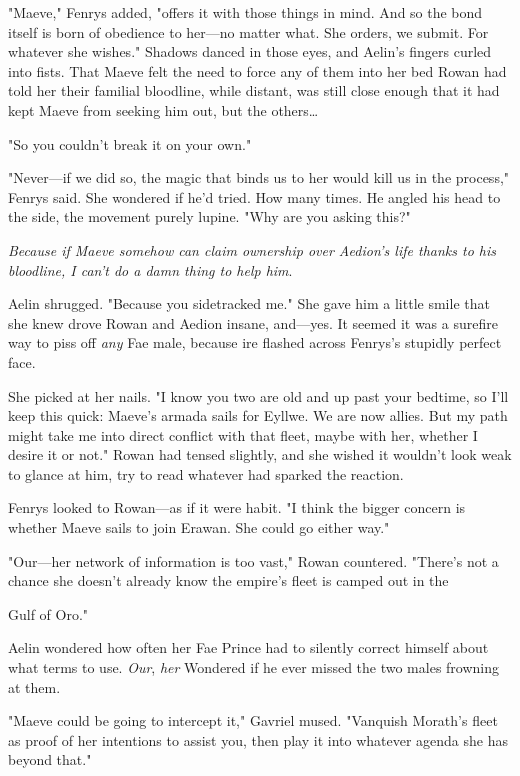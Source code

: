 "Maeve," Fenrys added, "offers it with those things in mind. And so the bond itself is born of obedience to her---no matter what. She orders, we submit. For whatever she wishes." Shadows danced in those eyes, and Aelin's fingers curled into fists. That Maeve felt the need to force any of them into her bed  Rowan had told her their familial bloodline, while distant, was still close enough that it had kept Maeve from seeking him out, but the others\ldots{}

"So you couldn't break it on your own."

"Never---if we did so, the magic that binds us to her would kill us in the process," Fenrys said. She wondered if he'd tried. How many times. He angled his head to the side, the movement purely lupine. "Why are you asking this?"

\emph{Because if Maeve somehow can claim ownership over Aedion's life thanks to his bloodline, I can't do a damn thing to help him}.

Aelin shrugged. "Because you sidetracked me." She gave him a little smile that she knew drove Rowan and Aedion insane, and---yes. It seemed it was a surefire way to piss off \emph{any} Fae male, because ire flashed across Fenrys's stupidly perfect face.

She picked at her nails. "I know you two are old and up past your bedtime, so I'll keep this quick: Maeve's armada sails for Eyllwe. We are now allies. But my path might take me into direct conflict with that fleet, maybe with her, whether I desire it or not." Rowan had tensed slightly, and she wished it wouldn't look weak to glance at him, try to read whatever had sparked the reaction.

Fenrys looked to Rowan---as if it were habit. "I think the bigger concern is whether Maeve sails to join Erawan. She could go either way."

"Our---her network of information is too vast," Rowan countered. "There's not a chance she doesn't already know the empire's fleet is camped out in the

Gulf of Oro."

Aelin wondered how often her Fae Prince had to silently correct himself about what terms to use. \emph{Our}, \emph{her}  Wondered if he ever missed the two males frowning at them.

"Maeve could be going to intercept it," Gavriel mused. "Vanquish Morath's fleet as proof of her intentions to assist you, then 
play it into whatever agenda she has beyond that."

